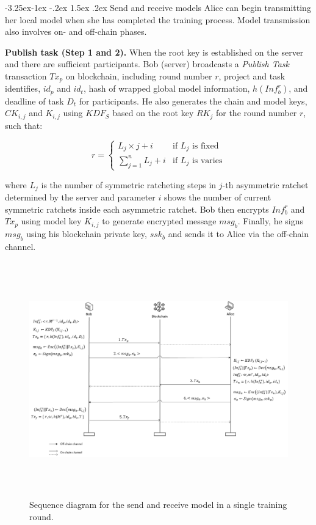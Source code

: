\documentclass[a4paper,fleqn]{cas-dc}
\makeatletter
\renewcommand\subsubsection{\@startsection{subsubsection}{3}{\z@}%
   {-3.25ex\@plus -1ex \@minus -.2ex}%
   {1.5ex \@plus .2ex}%
   {\normalfont\normalsize}} %
\makeatother
\begin{document}
\subsubsection{Send and receive models}
Alice can begin transmitting her local model when she has completed the training process. 
Model transmission also involves on- and off-chain phases.  

\noindent\textbf{Publish task (Step 1 and 2).} When the root key is established on the server and there are sufficient participants.
Bob (server) broadcasts a \textit{Publish Task} transaction $Tx_{p}$ on blockchain, including round number $r$, project and task identifies, $id_{p}$ and $id_{t}$, hash of wrapped global model information, $h(Inf_{b}^{r})$, and deadline of task $D_{t}$ for participants.
He also generates the chain and model keys, $CK_{i,j}$ and $K_{i,j}$ using $KDF_{S}$ based on the root key $RK_{j}$ for the round number $r$, such that:

\begin{equation}
    r=
    \begin{cases}
        L_{j}\times j+i   &     \text{if $L_{j}$ is fixed} \\[2ex]
    \sum_{j=1}^{n}L_{j}+i   & \text{if $L_{j}$ is varies}
    \end{cases}  
\end{equation}

\noindent  where $L_{j}$ is the number of symmetric ratcheting steps  in $j$-th asymmetric ratchet determined by the server and parameter $i$ shows the number of current symmetric ratchets inside each asymmetric ratchet.
Bob then encrypts $Inf_{b}^{r}$ and $Tx_{p}$ using model key $K_{i,j}$ to generate encrypted message $msg_{b}$. 
Finally, he signs $msg_{b}$ using his blockchain private key, $ssk_{b}$ and sends it to Alice via the off-chain channel.

\begin{figure}[ht]
    \centering
\includegraphics[width=6.2in,height=4in]{Images/4.png}
    \caption{Sequence diagram for the send and receive model in a single training round.}
    \label{fig:sequence diagram send/recive}
\end{figure}
\end{document}
